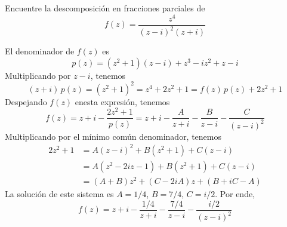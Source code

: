 \begin{exercise}
Encuentre la descomposición en fracciones parciales de
$$f(z) = \frac {z^4} {(z-i)^2 (z+i)}$$
\end{exercise}

\begin{solution}
El denominador de $f(z)$ es
$$p(z) = (z^2 + 1) (z - i) + z^3 - iz^2 + z - i$$
Multiplicando por $z - i$, tenemos
$$(z+i) \, p(z) = (z^2 + 1)^2 = z^4 + 2z^2 + 1 = f(z) \, p(z) + 2z^2 + 1$$
Despejando $f(z)$ enesta expresión, tenemos
$$f(z) = z + i - \frac {2z^2 + 1} {p(z)} = z + i - \frac A {z+i} - \frac B {z-i} - \frac C {(z-i)^2}$$
Multiplicando por el mínimo común denominador, tenemos
\begin{align*}
2z^2 + 1
    &= A (z - i)^2 + B (z^2 + 1) + C (z - i) \\
    &= A (z^2 - 2iz - 1) + B (z^2 + 1) + C (z - i) \\
    &= (A + B) z^2 + (C - 2iA) z + (B + iC - A)
\end{align*}
La solución de este sistema es $A = 1/4$, $B = 7/4$, $C = i/2$. Por ende,
$$f(z) = z + i - \frac {1/4} {z+i} - \frac {7/4} {z-i} - \frac {i/2} {(z-i)^2}$$
\end{solution}
